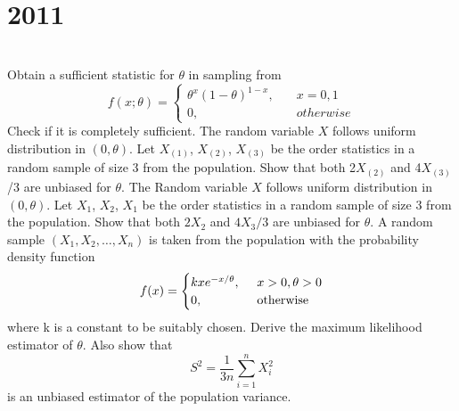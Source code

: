 \section*{2011}
\vspace{-.5cm}
\hrulefill \smallskip\\
 Obtain a sufficient statistic for $\theta$ in sampling from
\[ f(x;\theta) = \begin{cases}\theta^x(1 -\theta)^{1-x}, \quad &x = 0,1 \\
0, & otherwise
\end{cases}\] Check if it is completely sufficient.
\myline
{} The random variable $X$ follows uniform distribution in $(0, \theta)$. Let $X_{(1)}$, $X_{(2)}$, $X_{(3)}$ be the order statistics in a random sample of size 3 from the population. Show that both 2$X_{(2)}$ and 4$X_{(3)}$/3 are unbiased for $\theta$.
\myline
{} The Random variable $X$ follows uniform distribution in $\left(0, \theta \right)$. Let $X_{1}$, $X_{2}$, $X_{1}$ be the order statistics in a random sample of size 3 from the population. Show that both $2X_{2}$ and $4X_{3}/3$ are unbiased for $\theta$.
\myline
{} A random sample $(X_1,X_2,\dotsc,X_n)$ is taken from the population with the probability density function
\[f(x) = \begin{cases}kxe^{-x/\theta}, \enskip & x>0, \theta >0 \\
0, & \text{otherwise}
\end{cases}\] where k is a constant to be suitably chosen. Derive the maximum likelihood estimator of  $\theta$. Also show that
\[ S^2 = \frac{1}{3n}\sum_{i = 1}^nX_i^2 \] is an unbiased estimator of the population variance.